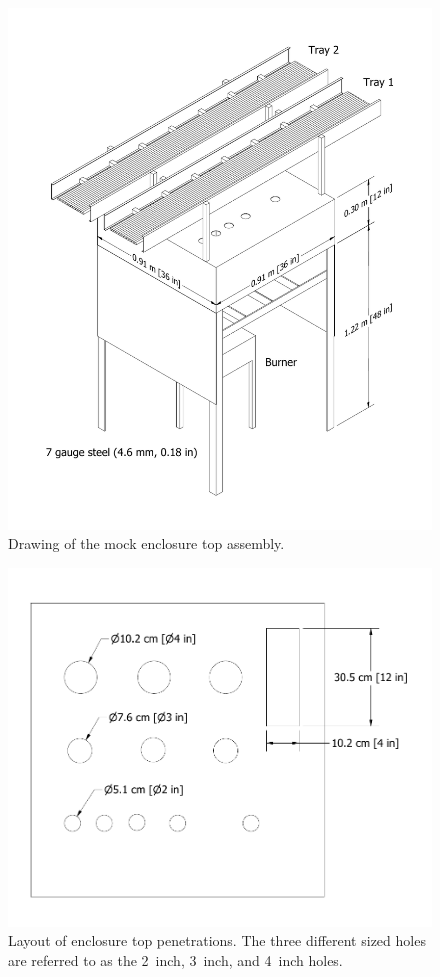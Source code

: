 \begin{figure}[p]
\includegraphics[width=\textwidth]{../FIGURES/Cabinet_Top_Assembly_with_Trays}
\caption[Drawing of mock enclosure top]{Drawing of the mock enclosure top assembly.}
\label{mock_cabinet_with_trays}
\end{figure}

\begin{figure}[p]
\includegraphics[width=\textwidth]{../FIGURES/Cabinet_Top_Assembly_No_Dims}
\caption[Layout of enclosure top penetrations]{Layout of enclosure top penetrations. The three different sized holes are referred to as the 2~inch, 3~inch, and 4~inch holes.}
\label{mock_cabinet_penetrations}
\end{figure}

